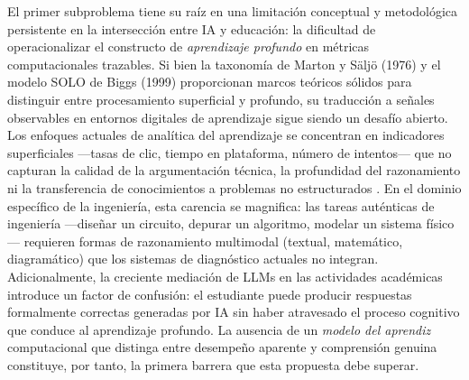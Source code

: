 
El primer subproblema tiene su raíz en una limitación conceptual y metodológica
persistente en la intersección entre IA y educación: la dificultad de operacionalizar el
constructo de \emph{aprendizaje profundo} en métricas computacionales trazables. Si bien
la taxonomía de Marton y Säljö (1976) y el modelo SOLO de Biggs (1999) proporcionan
marcos teóricos sólidos para distinguir entre procesamiento superficial y profundo, su
traducción a señales observables en entornos digitales de aprendizaje sigue siendo un
desafío abierto. Los enfoques actuales de analítica del aprendizaje se concentran en
indicadores superficiales —tasas de clic, tiempo en plataforma, número de intentos— que
no capturan la calidad de la argumentación técnica, la profundidad del razonamiento ni la
transferencia de conocimientos a problemas no estructurados \cite{hooshyar2024systematic}.
En el dominio específico de la ingeniería, esta carencia se magnifica: las tareas
auténticas de ingeniería —diseñar un circuito, depurar un algoritmo, modelar un sistema
físico— requieren formas de razonamiento multimodal (textual, matemático, diagramático)
que los sistemas de diagnóstico actuales no integran. Adicionalmente, la creciente
mediación de LLMs en las actividades académicas introduce un factor de confusión: el
estudiante puede producir respuestas formalmente correctas generadas por IA sin haber
atravesado el proceso cognitivo que conduce al aprendizaje profundo. La ausencia de un
\emph{modelo del aprendiz} computacional que distinga entre desempeño aparente y
comprensión genuina constituye, por tanto, la primera barrera que esta propuesta debe
superar.


